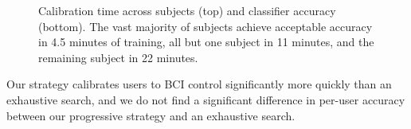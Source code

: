 \begin{figure}[!h]
  \vspace{-0.2cm}
  \centering

  
  \def\angle{0}
\def\radius{2.9}
\def\cyclelist{{"red","green","blue","yellow"}}
\newcount\cyclecount {}
\newcount\ind {}
  \vspace{0.1cm}
  
  \caption{Calibration time across subjects (top) and classifier accuracy (bottom). The vast majority of subjects achieve acceptable accuracy in 4.5 minutes of training, all but one subject in 11 minutes, and the remaining subject in 22 minutes. }
  \label{fig:calibration_results}
  \vspace{-0.1cm}
\end{figure}

Our strategy calibrates users to BCI control significantly more quickly than an exhaustive search, and we do not find a significant difference in per-user accuracy between our progressive strategy and an exhaustive search. 

